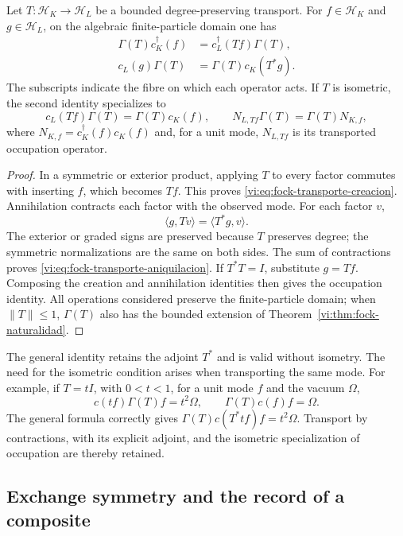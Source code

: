 \begin{proposition}
\label{vi:prop:fock-transporte-adjunto}
Let \(T:\mathcal H_K\to\mathcal H_L\) be a bounded
degree-preserving transport. For \(f\in\mathcal H_K\) and
\(g\in\mathcal H_L\), on the algebraic finite-particle domain
one has
\begin{align}
 \Gamma(T)c_K^\dagger(f)
 &=c_L^\dagger(Tf)\Gamma(T),
 \label{vi:eq:fock-transporte-creacion}\\
 c_L(g)\Gamma(T)
 &=\Gamma(T)c_K(T^*g).
 \label{vi:eq:fock-transporte-aniquilacion}
\end{align}
The subscripts indicate the fibre on which each operator acts.
If \(T\) is isometric, the second identity specializes to
\[
 c_L(Tf)\Gamma(T)=\Gamma(T)c_K(f),
 \qquad
 N_{L,Tf}\Gamma(T)=\Gamma(T)N_{K,f},
\]
where \(N_{K,f}=c_K^\dagger(f)c_K(f)\) and, for a unit mode,
\(N_{L,Tf}\) is its transported occupation operator.
\end{proposition}
\begin{proof}
In a symmetric or exterior product, applying \(T\) to every factor
commutes with inserting \(f\), which becomes \(Tf\).
This proves \eqref{vi:eq:fock-transporte-creacion}.
Annihilation contracts each factor with the observed mode.
For each factor \(v\),
\[
 \langle g,Tv\rangle=\langle T^*g,v\rangle.
\]
The exterior or graded signs are preserved because \(T\)
preserves degree; the symmetric normalizations are the same on
both sides. The sum of contractions proves
\eqref{vi:eq:fock-transporte-aniquilacion}. If \(T^*T=I\),
substitute \(g=Tf\). Composing the creation and annihilation
identities then gives the occupation identity.
All operations considered preserve the finite-particle domain;
when \(\|T\|\le1\), \(\Gamma(T)\) also has the bounded extension
of Theorem~\ref{vi:thm:fock-naturalidad}.
\end{proof}

The general identity retains the adjoint \(T^*\) and is valid without
isometry. The need for the isometric condition arises when transporting
the same mode. For example, if \(T=tI\), with \(0<t<1\),
for a unit mode \(f\) and the vacuum \(\Omega\),
\[
 c(tf)\Gamma(T)f=t^2\Omega,
 \qquad \Gamma(T)c(f)f=\Omega.
\]
The general formula correctly gives
\(\Gamma(T)c(T^*tf)f=t^2\Omega\). Transport by contractions,
with its explicit adjoint, and the isometric specialization of occupation
are thereby retained.

\subsection{Exchange symmetry and the record of a composite}
\label{vi:subsec:pauli-composicion}

